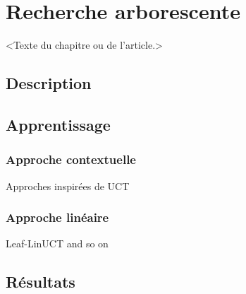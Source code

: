 \chapter{Recherche arborescente}
\label{chap:mcts}                   %

<Texte du chapitre ou de l'article.>

\section{Description}

\section{Apprentissage}

\subsection{Approche contextuelle}

Approches inspirées de UCT

\subsection{Approche linéaire}

Leaf-LinUCT and so on

\section{Résultats}

